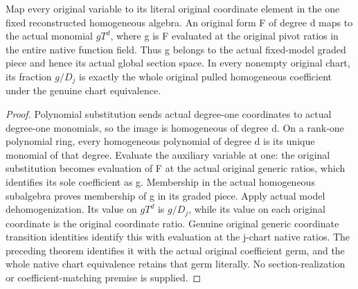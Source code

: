 \begin{theorem}
\label{thm:projective-native-homogeneous-image}
\leanok
{}
Map every original variable to its literal original coordinate element in the
one fixed reconstructed homogeneous algebra. An original form F of degree d
maps to the actual monomial $g T^d$, where g is F evaluated at the original
pivot ratios in the entire native function field. Thus g belongs to the
actual fixed-model graded piece and hence its actual global section space.
In every nonempty original chart, its fraction $g/D_j$ is exactly the whole
original pulled homogeneous coefficient under the genuine chart equivalence.
\end{theorem}
\begin{proof}
Polynomial substitution sends actual degree-one coordinates to actual
degree-one monomials, so the image is homogeneous of degree d. On a rank-one
polynomial ring, every homogeneous polynomial of degree d is its unique
monomial of that degree. Evaluate the auxiliary variable at one: the original
substitution becomes evaluation of F at the actual original generic ratios,
which identifies its sole coefficient as g. Membership in the actual
homogeneous subalgebra proves membership of g in its graded piece. Apply
actual model dehomogenization. Its value on $g T^d$ is $g/D_j$, while its value on
each original coordinate is the original coordinate ratio. Genuine original
generic coordinate transition identities identify this with evaluation at
the j-chart native ratios. The preceding theorem identifies it with the
actual original coefficient germ, and the whole native chart equivalence
retains that germ literally. No section-realization or coefficient-matching
premise is supplied.
\end{proof}
